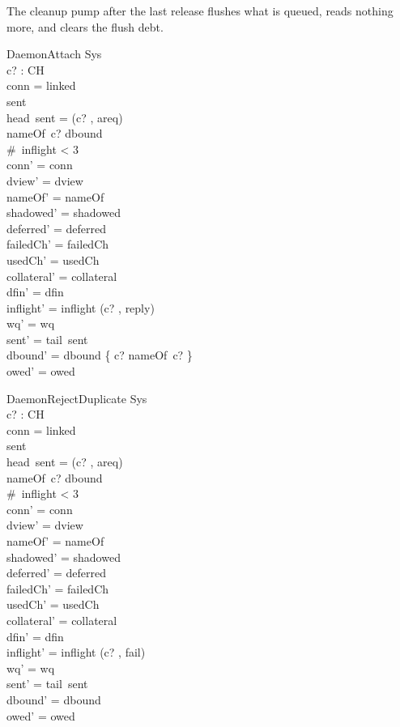 \documentclass[a4paper,10pt,fleqn]{article}
\begin{document}
The cleanup pump after the last release flushes what is queued, reads nothing more, and clears the flush debt.

\begin{schema}{DaemonAttach}
  \Delta Sys \\
  c? : CH \\
\where
  conn = linked \\
  sent \neq \langle \rangle \\
  head~sent = (c? , areq) \\
  nameOf~c? \notin \ran dbound \\
  \#~inflight < 3 \\
  conn' = conn \\
  dview' = dview \\
  nameOf' = nameOf \\
  shadowed' = shadowed \\
  deferred' = deferred \\
  failedCh' = failedCh \\
  usedCh' = usedCh \\
  collateral' = collateral \\
  dfin' = dfin \\
  inflight' = inflight \cat \langle (c? , reply) \rangle \\
  wq' = wq \\
  sent' = tail~sent \\
  dbound' = dbound \cup \{ c? \mapsto nameOf~c? \} \\
  owed' = owed
\end{schema}

\begin{schema}{DaemonRejectDuplicate}
  \Delta Sys \\
  c? : CH \\
\where
  conn = linked \\
  sent \neq \langle \rangle \\
  head~sent = (c? , areq) \\
  nameOf~c? \in \ran dbound \\
  \#~inflight < 3 \\
  conn' = conn \\
  dview' = dview \\
  nameOf' = nameOf \\
  shadowed' = shadowed \\
  deferred' = deferred \\
  failedCh' = failedCh \\
  usedCh' = usedCh \\
  collateral' = collateral \\
  dfin' = dfin \\
  inflight' = inflight \cat \langle (c? , fail) \rangle \\
  wq' = wq \\
  sent' = tail~sent \\
  dbound' = dbound \\
  owed' = owed
\end{schema}
\end{document}

